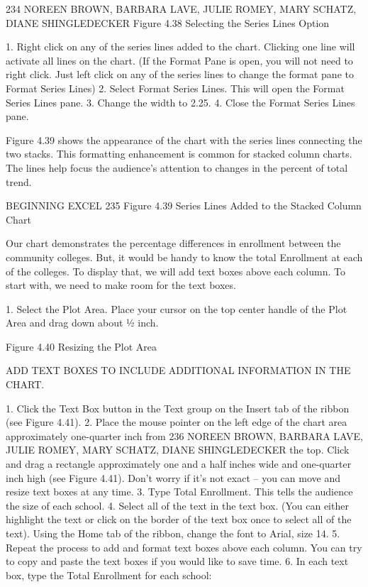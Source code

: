 234 NOREEN BROWN, BARBARA LAVE, JULIE ROMEY, MARY SCHATZ, DIANE SHINGLEDECKER
Figure 4.38 Selecting the Series Lines Option


1. Right click on any of the series lines added to the chart. Clicking one line will activate all lines
on the chart. (If the Format Pane is open, you will not need to right click. Just left click on any of
the series lines to change the format pane to Format Series Lines)
2. Select Format Series Lines. This will open the Format Series Lines pane.
3. Change the width to 2.25.
4. Close the Format Series Lines pane.

Figure 4.39 shows the appearance of the chart with the series lines connecting the two stacks. This
formatting enhancement is common for stacked column charts. The lines help focus the audience’s
attention to changes in the percent of total trend.




BEGINNING EXCEL 235
Figure 4.39 Series Lines Added to the Stacked Column Chart


Our chart demonstrates the percentage differences in enrollment between the community colleges.
But, it would be handy to know the total Enrollment at each of the colleges. To display that, we will
add text boxes above each column. To start with, we need to make room for the text boxes.

1. Select the Plot Area. Place your cursor on the top center handle of the Plot Area and drag down
about ½ inch.




Figure 4.40 Resizing the Plot Area


ADD TEXT BOXES TO INCLUDE ADDITIONAL INFORMATION IN THE CHART.

1. Click the Text Box button in the Text group on the Insert tab of the ribbon (see Figure 4.41).
2. Place the mouse pointer on the left edge of the chart area approximately one-quarter inch from
236 NOREEN BROWN, BARBARA LAVE, JULIE ROMEY, MARY SCHATZ, DIANE SHINGLEDECKER
the top. Click and drag a rectangle approximately one and a half inches wide and one-quarter
inch high (see Figure 4.41). Don’t worry if it’s not exact – you can move and resize text boxes at
any time.
3.   Type Total Enrollment. This tells the audience the size of each school.
4.   Select all of the text in the text box. (You can either highlight the text or click on the border of
the text box once to select all of the text). Using the Home tab of the ribbon, change the font to
Arial, size 14.
5.   Repeat the process to add and format text boxes above each column. You can try to copy and
paste the text boxes if you would like to save time.
6.   In each text box, type the Total Enrollment for each school:

